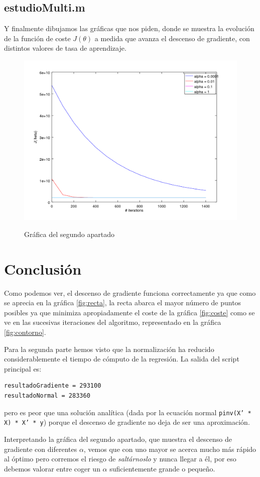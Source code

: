 \documentclass{article}
\begin{document}
\subsection{estudioMulti.m}
Y finalmente dibujamos las gráficas que nos piden, donde se muestra la evolución de la función de coste $J(\theta)$ a medida que avanza el descenso de gradiente, con distintos valores de tasa de aprendizaje.


\begin{figure}[h]
\centering
\includegraphics[width=\textwidth]{estudioMulti}
\label{fig:estudio}

\caption{Gráfica del segundo apartado}
\end{figure}
\pagebreak

\section{Conclusión}
Como podemos ver, el descenso de gradiente funciona correctamente ya que como se aprecia en la gráfica \ref{fig:recta}, la recta abarca el mayor número de puntos posibles ya que minimiza apropiadamente el coste de la gráfica \ref{fig:coste} como se ve en las sucesivas iteraciones del algoritmo, representado en la gráfica \ref{fig:contorno}.
\vspace{3mm}

Para la segunda parte hemos visto que la normalización ha reducido considerablemente el tiempo de cómputo de la regresión.
La salida del script principal es:
\begin{lstlisting}[style=snippet]
resultadoGradiente = 293100
resultadoNormal = 283360
\end{lstlisting}
pero es peor que una solución analítica (dada por la ecuación normal {\tt pinv(X' * X) * X' * y}) porque el descenso de gradiente no deja de ser una aproximación.

Interpretando la gráfica del segundo apartado, que muestra el descenso de gradiente con diferentes $\alpha$, vemos que con uno mayor se acerca mucho más rápido al óptimo pero corremos el riesgo de {\it saltárnoslo} y nunca llegar a él, por eso debemos valorar entre coger un $\alpha$ suficientemente grande o pequeño.
\end{document}
